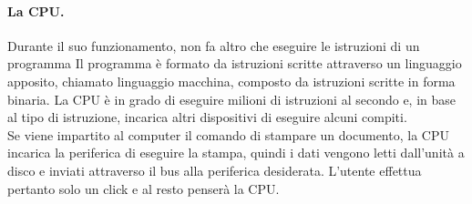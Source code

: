 \documentclass[a4paper]{report}
\begin{document}
\paragraph{La CPU.} Durante il suo funzionamento, non fa altro che eseguire le
istruzioni di un programma Il programma è formato da istruzioni
scritte attraverso un linguaggio apposito, chiamato linguaggio
macchina, composto da istruzioni scritte in forma binaria. La
CPU è in grado di eseguire milioni di istruzioni al secondo e, in
base al tipo di istruzione, incarica altri dispositivi di eseguire
alcuni compiti.\\Se viene impartito al computer il comando di stampare un
documento, la CPU incarica la periferica di eseguire la stampa,
quindi i dati vengono letti dall'unità a disco e inviati attraverso il
bus alla periferica desiderata. L'utente effettua pertanto solo un
click e al resto penserà la CPU.
\end{document}

